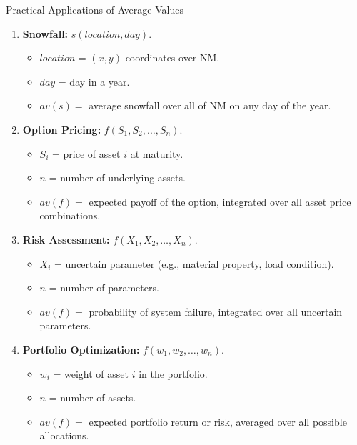 \documentclass[10pt]{beamer}
\begin{document}
\begin{frame}{Practical Applications of Average Values}
    \begin{enumerate}
        \item \textbf{Snowfall:} $s(location, day)$.
        \begin{itemize}
            \item $location$ = $(x, y)$ coordinates over NM.
            \item $day$ = day in a year.
            \item $av(s) = $ average snowfall over all of NM on any day of the year.
        \end{itemize}

        \item \textbf{Option Pricing:} $f(S_1, S_2, \ldots, S_n)$.
        \begin{itemize}
            \item $S_i$ = price of asset $i$ at maturity.
            \item $n$ = number of underlying assets.
            \item $av(f) = $ expected payoff of the option, integrated over all asset price combinations.
        \end{itemize}

        \item \textbf{Risk Assessment:} $f(X_1, X_2, \ldots, X_n)$.
        \begin{itemize}
            \item $X_i$ = uncertain parameter (e.g., material property, load condition).
            \item $n$ = number of parameters.
            \item $av(f) = $ probability of system failure, integrated over all uncertain parameters.
        \end{itemize}

        \item \textbf{Portfolio Optimization:} $f(w_1, w_2, \ldots, w_n)$.
        \begin{itemize}
            \item $w_i$ = weight of asset $i$ in the portfolio.
            \item $n$ = number of assets.
            \item $av(f) = $ expected portfolio return or risk, averaged over all possible allocations.
        \end{itemize}
    \end{enumerate}
\end{frame}
\end{document}
